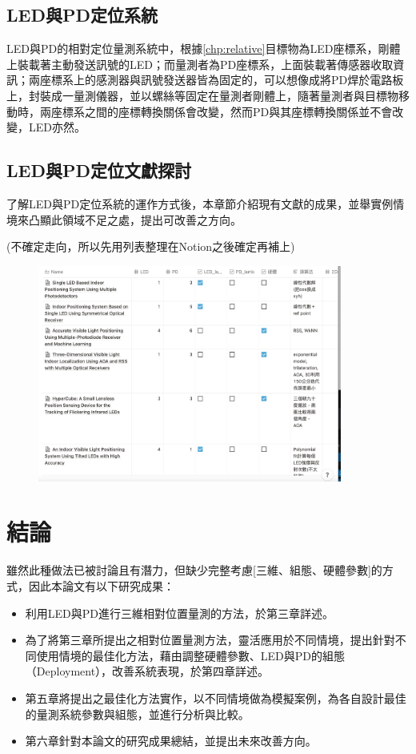     \subsection{LED與PD定位系統}

        LED與PD的相對定位量測系統中，根據\ref{chp:relative}目標物為LED座標系，剛體上裝載著主動發送訊號的LED；而量測者為PD座標系，上面裝載著傳感器收取資訊；兩座標系上的感測器與訊號發送器皆為固定的，可以想像成將PD焊於電路板上，封裝成一量測儀器，並以螺絲等固定在量測者剛體上，隨著量測者與目標物移動時，兩座標系之間的座標轉換關係會改變，然而PD與其座標轉換關係並不會改變，LED亦然。





    \subsection{LED與PD定位文獻探討}

        了解LED與PD定位系統的運作方式後，本章節介紹現有文獻的成果，並舉實例情境來凸顯此領域不足之處，提出可改善之方向。
        
        (不確定走向，所以先用列表整理在Notion之後確定再補上)

        \begin{figure}[ht]
            \centering
            \includegraphics[width=10cm]{00temppic/temp.png}
        \end{figure}



\section{結論}

雖然此種做法已被討論且有潛力，但缺少完整考慮[三維、組態、硬體參數]的方式，因此本論文有以下研究成果：
\begin{itemize}
    \item 利用LED與PD進行三維相對位置量測的方法，於第三章詳述。
    \item 為了將第三章所提出之相對位置量測方法，靈活應用於不同情境，提出針對不同使用情境的最佳化方法，藉由調整硬體參數、LED與PD的組態（Deployment），改善系統表現，於第四章詳述。
    \item 第五章將提出之最佳化方法實作，以不同情境做為模擬案例，為各自設計最佳的量測系統參數與組態，並進行分析與比較。
    \item 第六章針對本論文的研究成果總結，並提出未來改善方向。
\end{itemize}